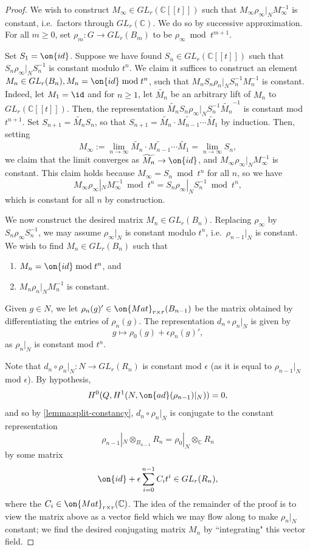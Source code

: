 \begin{proof}
We wish to construct $M_\infty\in GL_r(\mathbb{C}[[t]])$ such that $M_\infty\rho_\infty|_NM_\infty^{-1}$ is constant, i.e.~factors through $GL_r(\mathbb{C})$. We do so by successive approximation. For all $m\geq 0$, set $\rho_m: G\to GL_r(B_m)$ to be $\rho_\infty \bmod t^{m+1}$.

Set $S_1=\on{id}$. Suppose we have found $S_n\in GL_r(\mathbb{C}[[t]])$ such
that $S_n\rho_\infty|_N S_n^{-1}$ is constant modulo $t^n$.  We claim it
suffices to construct an element $M_n\in GL_r(B_n), M_n=\on{id}\bmod t^n$, such
that $M_nS_n\rho_n|_N S_n^{-1}M_n^{-1}$ is constant. Indeed, let
$M_1 = \id$ and for $n \geq 1$, let
$\widetilde{M_n}$ be an arbitrary lift of $M_n$ to $GL_r(\mathbb{C}[[t]])$.
Then, the representation $\widetilde{M_n}S_n\rho_\infty|_NS_n^{-1}\widetilde{M_n}^{-1}$ is
constant mod $t^{n+1}$. Set $S_{n+1}=\widetilde{M_n}S_n$, so that $S_{n+1} =
\widetilde{M_n} \cdot \widetilde{M_{n-1}} \cdots \widetilde{M_1}$ by induction.
Then, setting $$M_\infty:=\lim_{n\to
\infty}\widetilde{M_n}\cdot\widetilde{M_{n-1}}\cdots
\widetilde{M_1}=\lim_{n\to\infty} S_n,$$ we claim that the limit converges as
$\widetilde{M_n}\to \on{id}$, and $M_\infty\rho_\infty|_N M_{\infty}^{-1}$ is
constant. This claim holds because $M_\infty=S_n\bmod t^n$ for all $n$, so we
have $$M_\infty \rho_\infty|_N M_\infty^{-1}\bmod t^n=S_n\rho_\infty|_N
S_n^{-1}\bmod t^n,$$ which is constant for all $n$ by construction.

We now construct the desired matrix $M_n\in GL_r(B_n)$. Replacing $\rho_\infty$ by $S_n\rho_\infty S_n^{-1}$, we may assume $\rho_\infty|_N$ is constant modulo $t^n$, i.e.~$\rho_{n-1}|_N$ is constant. We wish to find $M_n\in GL_r(B_n)$ such that
\begin{enumerate}
\item $M_n=\on{id} \bmod t^n$, and
\item $M_n\rho_n|_NM_n^{-1}$ is constant.
\end{enumerate}

Given $g\in N$, we let $\rho_n(g)'\in \on{Mat}_{r\times r}(B_{n-1})$ be the matrix obtained by differentiating the entries of $\rho_n(g)$. The representation $d_n\circ \rho_n|_N$ is given by $$g\mapsto \rho_0(g)+\epsilon\rho_n(g)',$$ as $\rho_n|_N$ is constant mod $t^{n}$.

Note that $d_n\circ \rho_n|_N: N\to GL_r(R_n)$ is constant mod $\epsilon$ (as it is equal to $\rho_{n-1}|_N$ mod $\epsilon$). By hypothesis, $$H^0(Q, H^1(N, \on{ad}(\rho_{n-1})|_N))=0,$$ and so by \autoref{lemma:split-constancy}, $d_n\circ\rho_n|_N$ is conjugate to the constant representation $$\rho_{n-1}|_N\otimes_{B_{n-1}} R_n=\rho_0|_N\otimes_{\mathbb{C}} R_n$$
by some matrix $$\on{id}+\epsilon\sum_{i=0}^{n-1}C_it^i\in GL_r(R_n),$$ where
the $C_i\in \on{Mat}_{r\times r}(\mathbb{C})$. The idea of the remainder of the proof is to view the matrix above as a vector field which we may flow along to make $\rho_n|_N$ constant; we find the desired conjugating matrix $M_n$ by ``integrating" this vector field.


\end{proof}
